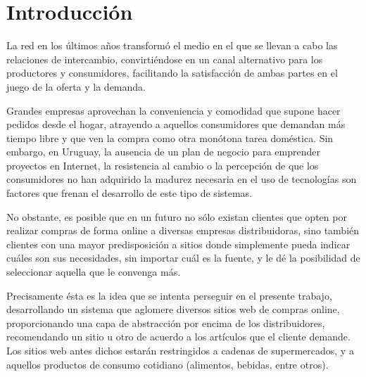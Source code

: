 \documentclass[12pt]{article} %
\begin{document}

\tableofcontents %

\newpage %


\section{Introducción} 
La red en los últimos años transformó el medio en el que se llevan a cabo las relaciones de intercambio, convirtiéndose en un canal alternativo para los productores y consumidores, facilitando la satisfacción de ambas partes en el juego de la oferta y la demanda.

Grandes empresas aprovechan la conveniencia y comodidad que supone hacer pedidos desde el hogar, atrayendo a aquellos consumidores que demandan más tiempo libre y que ven la compra como otra monótona tarea doméstica. Sin embargo, en Uruguay, la ausencia de un plan de negocio para emprender proyectos en Internet, la resistencia al cambio o la percepción de que los consumidores no han adquirido la madurez necesaria en el uso de tecnologías son factores que frenan el desarrollo de este tipo de sistemas. 

No obstante, es posible que en un futuro no sólo existan clientes que opten por realizar compras de forma online a diversas empresas distribuidoras, sino también clientes con una mayor predisposición a sitios donde simplemente pueda indicar cuáles son sus necesidades, sin importar cuál es la fuente, y le dé la posibilidad de seleccionar aquella que le convenga más. 

Precisamente ésta es la idea que se intenta perseguir en el presente trabajo, desarrollando un sistema que aglomere diversos sitios web de compras online, proporcionando una capa de abstracción por encima de los distribuidores, recomendando un sitio u otro de acuerdo a los artículos que el cliente demande. Los sitios web antes dichos estarán restringidos a cadenas de supermercados, y a aquellos productos de consumo cotidiano (alimentos, bebidas, entre otros).
\end{document}
